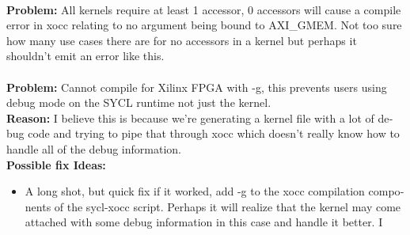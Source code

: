 \begin{otherlanguage}{english}
                                         \\
                                         \textbf{Problem:} All kernels require
                                         at least 1 accessor, 0 accessors will
                                         cause a compile error in xocc relating
                                         to no argument being bound to
                                         AXI\_GMEM. Not too sure how many use
                                         cases there are for no accessors in a
                                         kernel but perhaps it shouldn't emit an
                                         error like this.
                                         \\
                                         \\
                                         \textbf{Problem:} Cannot compile for
                                         Xilinx FPGA with -g, this prevents
                                         users using debug mode on the SYCL
                                         runtime not just the kernel.
                                         \\
                                         \textbf{Reason:} I believe this is 
                                         because we're generating a kernel file
                                         with a lot of debug code and trying to
                                         pipe that through xocc which doesn't
                                         really know how to handle all of the
                                         debug information.
                                         \\
                                         \textbf{Possible fix Ideas:}
                                         \begin{itemize}
                                             \item A long shot, but quick fix if
                                                   it worked, add -g to the xocc
                                                   compilation components of the
                                                   sycl-xocc script. Perhaps it
                                                   will realize that the kernel
                                                   may come attached with some
                                                   debug information in this
                                                   case and handle it better. I

\end{itemize}
\end{otherlanguage}
